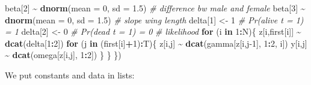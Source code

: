 \documentclass[
  12pt,
]{krantz}
\newenvironment{Shaded}{\begin{snugshade}}{\end{snugshade}}
\newcommand{\AttributeTok}[1]{\textcolor[rgb]{0.13,0.29,0.53}{#1}}
\newcommand{\CommentTok}[1]{\textcolor[rgb]{0.56,0.35,0.01}{\textit{#1}}}
\newcommand{\ControlFlowTok}[1]{\textcolor[rgb]{0.13,0.29,0.53}{\textbf{#1}}}
\newcommand{\DecValTok}[1]{\textcolor[rgb]{0.00,0.00,0.81}{#1}}
\newcommand{\FloatTok}[1]{\textcolor[rgb]{0.00,0.00,0.81}{#1}}
\newcommand{\FunctionTok}[1]{\textcolor[rgb]{0.13,0.29,0.53}{\textbf{#1}}}
\newcommand{\NormalTok}[1]{#1}
\newcommand{\OtherTok}[1]{\textcolor[rgb]{0.56,0.35,0.01}{#1}}
\newcommand{\SpecialCharTok}[1]{\textcolor[rgb]{0.81,0.36,0.00}{\textbf{#1}}}
\newcommand{\StringTok}[1]{\textcolor[rgb]{0.31,0.60,0.02}{#1}}
\begin{document}
\begin{Shaded}
\begin{Highlighting}[]
\NormalTok{  beta[}\DecValTok{2}\NormalTok{] }\SpecialCharTok{\textasciitilde{}} \FunctionTok{dnorm}\NormalTok{(}\AttributeTok{mean =} \DecValTok{0}\NormalTok{, }\AttributeTok{sd =} \FloatTok{1.5}\NormalTok{) }\CommentTok{\# difference bw male and female}
\NormalTok{  beta[}\DecValTok{3}\NormalTok{] }\SpecialCharTok{\textasciitilde{}} \FunctionTok{dnorm}\NormalTok{(}\AttributeTok{mean =} \DecValTok{0}\NormalTok{, }\AttributeTok{sd =} \FloatTok{1.5}\NormalTok{) }\CommentTok{\# slope wing length}
\NormalTok{  delta[}\DecValTok{1}\NormalTok{] }\OtherTok{\textless{}{-}} \DecValTok{1}                 \CommentTok{\# Pr(alive t = 1) = 1}
\NormalTok{  delta[}\DecValTok{2}\NormalTok{] }\OtherTok{\textless{}{-}} \DecValTok{0}                 \CommentTok{\# Pr(dead t = 1) = 0}
  \CommentTok{\# likelihood}
  \ControlFlowTok{for}\NormalTok{ (i }\ControlFlowTok{in} \DecValTok{1}\SpecialCharTok{:}\NormalTok{N)\{}
\NormalTok{    z[i,first[i]] }\SpecialCharTok{\textasciitilde{}} \FunctionTok{dcat}\NormalTok{(delta[}\DecValTok{1}\SpecialCharTok{:}\DecValTok{2}\NormalTok{])}
    \ControlFlowTok{for}\NormalTok{ (j }\ControlFlowTok{in}\NormalTok{ (first[i]}\SpecialCharTok{+}\DecValTok{1}\NormalTok{)}\SpecialCharTok{:}\NormalTok{T)\{}
\NormalTok{      z[i,j] }\SpecialCharTok{\textasciitilde{}} \FunctionTok{dcat}\NormalTok{(gamma[z[i,j}\DecValTok{{-}1}\NormalTok{], }\DecValTok{1}\SpecialCharTok{:}\DecValTok{2}\NormalTok{, i])}
\NormalTok{      y[i,j] }\SpecialCharTok{\textasciitilde{}} \FunctionTok{dcat}\NormalTok{(omega[z[i,j], }\DecValTok{1}\SpecialCharTok{:}\DecValTok{2}\NormalTok{])}
\NormalTok{    \}}
\NormalTok{  \}}
\NormalTok{\})}
\end{Highlighting}
\end{Shaded}

We put constants and data in lists:

\begin{Shaded}
\end{Shaded}
\end{document}
